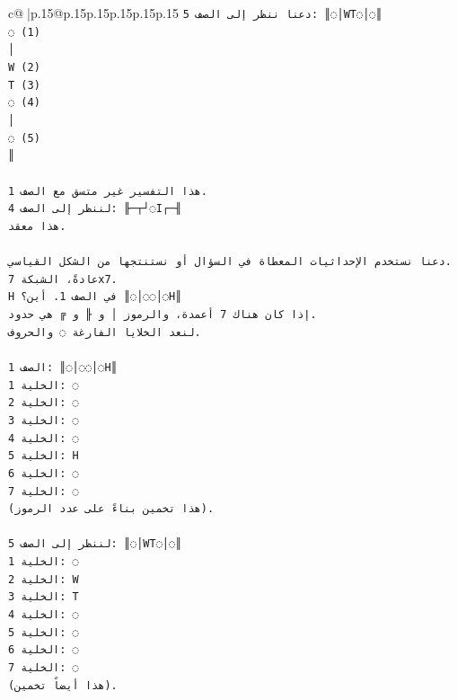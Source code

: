 \documentclass{article}
\begin{document}
{\begin{supertabular}{c@{$\;$}|p{.15\linewidth}@{}p{.15\linewidth}p{.15\linewidth}p{.15\linewidth}p{.15\linewidth}p{.15\linewidth}}
{{{\texttt{دعنا ننظر إلى الصف 5: ║◌│WT◌│◌║} \\
\texttt{◌ (1)} \\
\texttt{│} \\
\texttt{W (2)} \\
\texttt{T (3)} \\
\texttt{◌ (4)} \\
\texttt{│} \\
\texttt{◌ (5)} \\
\texttt{║} \\
\\ 
\texttt{هذا التفسير غير متسق مع الصف 1.} \\
\texttt{لننظر إلى الصف 4: ╟─┬┘◌I┌─╢} \\
\texttt{هذا معقد.} \\
\\ 
\texttt{دعنا نستخدم الإحداثيات المعطاة في السؤال أو نستنتجها من الشكل القياسي.} \\
\texttt{عادةً، الشبكة 7x7.} \\
\texttt{H في الصف 1. أين؟ ║◌│◌◌│◌H║} \\
\texttt{إذا كان هناك 7 أعمدة، والرموز │ و ╟ و ╔ هي حدود.} \\
\texttt{لنعد الخلايا الفارغة ◌ والحروف.} \\
\\ 
\texttt{الصف 1: ║◌│◌◌│◌H║} \\
\texttt{الخلية 1: ◌} \\
\texttt{الخلية 2: ◌} \\
\texttt{الخلية 3: ◌} \\
\texttt{الخلية 4: ◌} \\
\texttt{الخلية 5: H} \\
\texttt{الخلية 6: ◌} \\
\texttt{الخلية 7: ◌} \\
\texttt{(هذا تخمين بناءً على عدد الرموز).} \\
\\ 
\texttt{لننظر إلى الصف 5: ║◌│WT◌│◌║} \\
\texttt{الخلية 1: ◌} \\
\texttt{الخلية 2: W} \\
\texttt{الخلية 3: T} \\
\texttt{الخلية 4: ◌} \\
\texttt{الخلية 5: ◌} \\
\texttt{الخلية 6: ◌} \\
\texttt{الخلية 7: ◌} \\
\texttt{(هذا أيضاً تخمين).} \\
}}}
\end{supertabular}}
\end{document}
